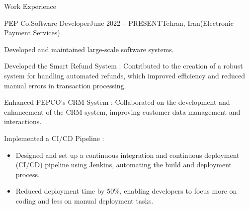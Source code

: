 \documentclass[]{kyvernitis-resume}
\begin{document}
\begin{section}{Work Experience}
    \begin{subsection}{PEP Co.}{Software Developer}{June 2022 -- PRESENT}{Tehran, Iran}{(Electronic Payment Services)}




		
		\item Developed and maintained large-scale software systems.
		\item Developed the Smart Refund System : Contributed to the creation of a robust system for handling automated refunds, which improved efficiency and reduced manual errors in transaction processing.
		\item Enhanced PEPCO's CRM System : Collaborated on the development and enhancement of the CRM system, improving customer data management and interactions.
		\item Implemented a CI/CD Pipeline :
			\begin{itemize}
				\item Designed and set up a continuous integration and continuous deployment (CI/CD) pipeline using Jenkins, automating the build and deployment process.
				\item Reduced deployment time by 50\%, enabling developers to focus more on coding and less on manual deployment tasks.


\end{itemize}
\end{subsection}
\end{section}
\end{document}
